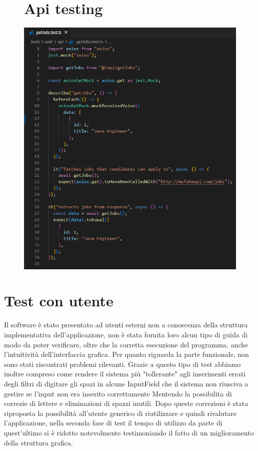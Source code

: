 \documentclass[ 4paper,11pt,openany]{book}
\begin{document}
\begin{figure}[htpb!] 
	\section{Api testing}
	\includegraphics{getJobTest.png}
\end{figure}
	
	
	
\section{Test con utente}
Il software è stato presentato ad utenti esterni non a conoscenza della struttura implementativa dell'applicazione, non è stata fornita loro alcun tipo di guida di modo da poter verificare, oltre che la corretta esecuzione del programma, anche l'intuitività dell'interfaccia grafica. Per quanto riguarda la parte funzionale, non sono stati riscontrati problemi rilevanti.
Grazie a questo tipo di test abbiamo inoltre compreso come rendere il sistema più "tollerante" agli inserimenti errati degli filtri di digitare gli spazi in alcune InputField che il sistema non riusciva a gestire se l'input non era inserito correttamente Mentendo la possibilita di correzie di lettere e eliminazioni di spazzi inutili. Dopo queste correzioni è stata riproposta la possibilità all'utente generico di riutilizzare e quindi rivalutare l'applicazione, nella seconda fase di test il tempo di utilizzo da parte di quest'ultimo si è ridotto notevolmente testimoniando il fatto di un miglioramento della struttura grafica.
	
\end{document}
